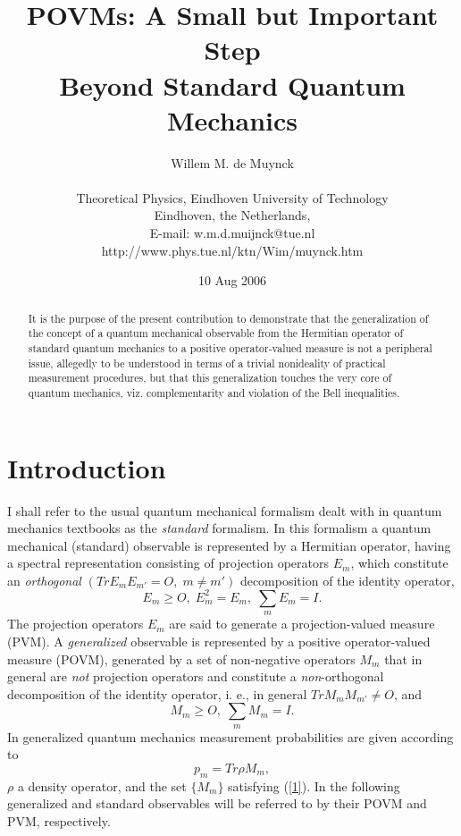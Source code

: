 \documentclass[12pt]{article}
\date{10 Aug 2006}
\begin{document}
\title{POVMs: A Small but Important Step\\ Beyond Standard Quantum Mechanics}

\author{Willem M. de Muynck\\
\\
Theoretical Physics,
Eindhoven University of Technology\\
Eindhoven, the Netherlands,\\
E-mail: w.m.d.muijnck@tue.nl\\
http://www.phys.tue.nl/ktn/Wim/muynck.htm}


\maketitle

\begin{abstract}
It is the purpose of the present contribution to demonstrate that
the generalization of the concept of a quantum mechanical
observable from the Hermitian operator of standard quantum
mechanics to a positive operator-valued measure is not a
peripheral issue, allegedly to be understood in terms of a trivial
nonideality of practical measurement procedures, but that this
generalization touches the very core of quantum mechanics, viz.
complementarity and violation of the Bell inequalities.
\end{abstract}


\section{Introduction}\label{sec1}
I shall refer to the usual quantum mechanical formalism dealt with
in quantum mechanics textbooks as the \textit{standard} formalism.
In this formalism a quantum mechanical (standard) observable is
represented by a Hermitian operator, having a spectral
representation consisting of projection operators $E_m$, which
constitute an \textit{orthogonal} $(Tr E_mE_{m'} = O,\; m\neq m')$
decomposition of the identity operator,
\[E_{m}\geq O,\; E_m^2 =E_m,\;\sum_{m} E_{m} = I.\]
The projection operators $E_m$ are said to generate a
projection-valued measure (PVM). A \textit{generalized} observable
is represented by a positive operator-valued measure (POVM),
generated by a set of non-negative operators $M_m$ that in general
are \textit{not} projection operators and constitute a
\textit{non}-orthogonal decomposition of the identity operator, i.
e., in general $Tr M_mM_{m'} \neq O$, and
\begin{equation}M_{m}\geq O, \;\sum_{m} M_{m} = I.\label{1}
\end{equation}
In generalized quantum mechanics measurement probabilities are
given according to
\begin{equation} p_m= Tr \rho M_m,\label{2}
\end{equation}
$\rho$ a density operator, and the set $\{M_m\}$ satisfying
(\ref{1}). In the following generalized and standard observables
will be referred to by their POVM and PVM, respectively.
\end{document}
